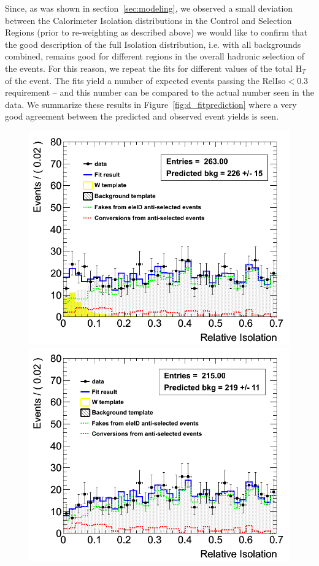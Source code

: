 Since, as was shown in section~\ref{sec:modeling}, we observed a small deviation between the Calorimeter Isolation distributions in the Control and Selection Regions (prior to re-weighting as described above) we would like to confirm that the good description of the full Isolation distribution, i.e. with all backgrounds combined, remains good for different regions in the overall hadronic selection of the events.  For this reason, we repeat the fits for different values of the total $\text{H}_{T}$ of the event.  The fits yield a number of expected events passing the RelIso$<0.3$ requirement -- and this number can be compared to the actual number seen in the data.  We summarize these results in Figure~\ref{fig:d_fitprediction} where a very good agreement between the predicted and observed event yields is seen.


\begin{figure}[h!]
\centering
\includegraphics[scale=0.32]{Plots/d_combIso_pt10_fit.png}
\includegraphics[scale=0.32]{Plots/d_combIso_pt10_METanticut_fit.png}

\end{figure}
